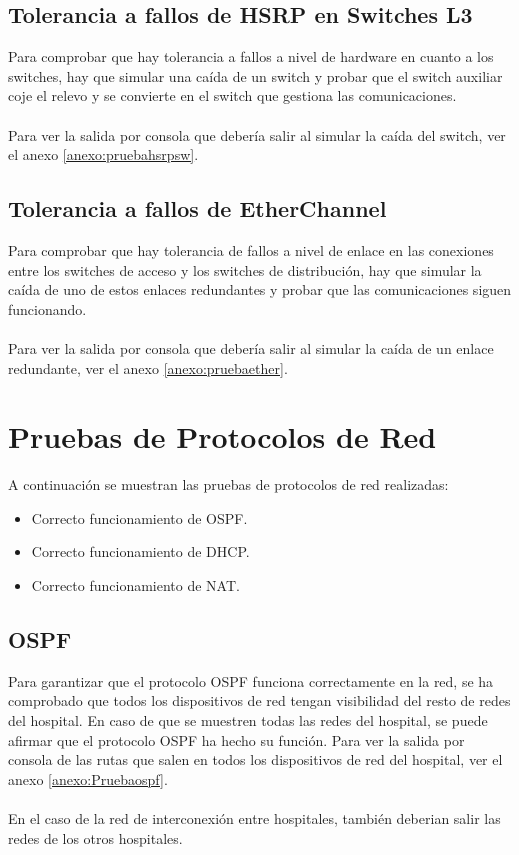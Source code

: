 \subsection{Tolerancia a fallos de HSRP en Switches L3}
Para comprobar que hay tolerancia a fallos a nivel de hardware en cuanto a los switches, hay que simular una caída de un switch y probar que el switch auxiliar coje el relevo y se convierte en 
el switch que gestiona las comunicaciones. 
\\ \\
Para ver la salida por consola que debería salir al simular la caída del switch, ver el anexo \ref{anexo:pruebahsrpsw}.
\subsection{Tolerancia a fallos de EtherChannel}
Para comprobar que hay tolerancia de fallos a nivel de enlace en las conexiones entre los switches de acceso y los switches de distribución, hay que simular la caída de uno de estos enlaces redundantes y probar que las comunicaciones siguen funcionando.
\\ \\
Para ver la salida por consola que debería salir al simular la caída de un enlace redundante, ver el anexo \ref{anexo:pruebaether}.

\section{Pruebas de Protocolos de Red}
A continuación se muestran las pruebas de protocolos de red realizadas:
\begin{itemize}
    \item Correcto funcionamiento de OSPF.
    \item Correcto funcionamiento de DHCP.
    \item Correcto funcionamiento de NAT.
\end{itemize}
\subsection{OSPF}
Para garantizar que el protocolo OSPF funciona correctamente en la red, se ha comprobado que todos los dispositivos de red tengan visibilidad del resto de redes del hospital. 
En caso de que se muestren todas las redes del hospital, se puede afirmar que el protocolo OSPF ha hecho su función. Para ver la salida por consola de las rutas que salen en todos 
los dispositivos de red del hospital, ver el anexo \ref{anexo:Pruebaospf}. 
\\ \\
En el caso de la red de interconexión entre hospitales, también deberian salir las redes de los otros hospitales.
